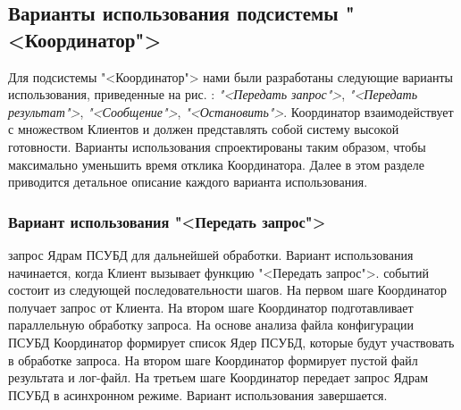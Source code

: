 \documentclass[11pt,oneside]{article}
\begin{document}
\subsection{Варианты использования подсистемы "<Координатор">}\label{S_CoordinatorUseCases}


Для подсистемы "<Координатор"> нами были разработаны следующие варианты использования, приведенные на рис. %
: \textit{"<Передать запрос">}, \textit{"<Передать результат">}, \textit{"<Сообщение">}, \textit{"<Остановить">}. Координатор взаимодействует с множеством Клиентов и должен представлять собой систему высокой готовности. Варианты использования спроектированы таким образом, чтобы максимально уменьшить время отклика Координатора. Далее в этом разделе приводится детальное описание каждого варианта использования.

\subsubsection{Вариант использования "<Передать запрос">}
 запрос Ядрам ПСУБД для дальнейшей обработки. Вариант использования начинается, когда Клиент вызывает функцию "<Передать запрос">.
 событий состоит из следующей последовательности шагов. На первом шаге Координатор получает запрос от Клиента. На втором шаге Координатор подготавливает параллельную обработку запроса. На основе анализа файла конфигурации ПСУБД Координатор формирует список Ядер ПСУБД, которые будут участвовать в обработке запроса. На втором шаге Координатор формирует пустой файл результата и лог-файл. На третьем шаге Координатор передает запрос Ядрам ПСУБД в асинхронном режиме. Вариант использования завершается.
\end{document}
